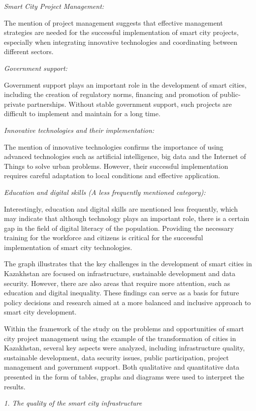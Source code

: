 \begin{multicols}{2}
\emph{Smart City Project Management:}

The mention of project management suggests that effective management
strategies are needed for the successful implementation of smart city
projects, especially when integrating innovative technologies and
coordinating between different sectors.

\emph{Government support:}

Government support plays an important role in the development of smart
cities, including the creation of regulatory norms, financing and
promotion of public-private partnerships. Without stable government
support, such projects are difficult to implement and maintain for a
long time.

\emph{Innovative technologies and their implementation:}

The mention of innovative technologies confirms the importance of using
advanced technologies such as artificial intelligence, big data and the
Internet of Things to solve urban problems. However, their successful
implementation requires careful adaptation to local conditions and
effective application.

\emph{Education and digital skills (A less frequently mentioned
category):}

Interestingly, education and digital skills are mentioned less
frequently, which may indicate that although technology plays an
important role, there is a certain gap in the field of digital literacy
of the population. Providing the necessary training for the workforce
and citizens is critical for the successful implementation of smart city
technologies.

The graph illustrates that the key challenges in the development of
smart cities in Kazakhstan are focused on infrastructure, sustainable
development and data security. However, there are also areas that
require more attention, such as education and digital inequality. These
findings can serve as a basis for future policy decisions and research
aimed at a more balanced and inclusive approach to smart city
development.

Within the framework of the study on the problems and opportunities of
smart city project management using the example of the transformation of
cities in Kazakhstan, several key aspects were analyzed, including
infrastructure quality, sustainable development, data security issues,
public participation, project management and government support. Both
qualitative and quantitative data presented in the form of tables,
graphs and diagrams were used to interpret the results.

\emph{1. The quality of the smart city infrastructure}
\end{multicols}

